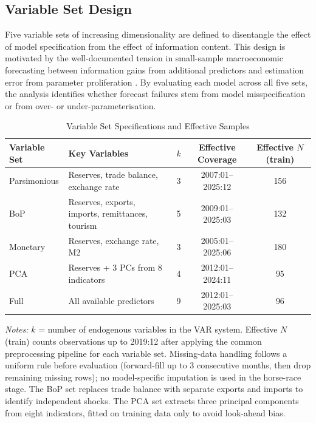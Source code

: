 \documentclass[12pt,a4paper]{article}
\begin{document}
\subsection{Variable Set Design}

Five variable sets of increasing dimensionality are defined to disentangle the effect of model specification from the effect of information content. This design is motivated by the well-documented tension in small-sample macroeconomic forecasting between information gains from additional predictors and estimation error from parameter proliferation \citep{Banbura2010,Carriero2015}. By evaluating each model across all five sets, the analysis identifies whether forecast failures stem from model misspecification or from over- or under-parameterisation.

\begin{table}[htbp]
\centering
\caption{Variable Set Specifications and Effective Samples}
\label{tab:varsets}
\begin{tabular}{llccc}
\toprule
Variable Set & Key Variables & $k$ & Effective Coverage & Effective $N$ (train) \\
\midrule
Parsimonious & Reserves, trade balance, exchange rate & 3 & 2007:01--2025:12 & 156 \\
BoP & Reserves, exports, imports, remittances, tourism & 5 & 2009:01--2025:03 & 132 \\
Monetary & Reserves, exchange rate, M2 & 3 & 2005:01--2025:06 & 180 \\
PCA & Reserves + 3 PCs from 8 indicators & 4 & 2012:01--2024:11 & 95 \\
Full & All available predictors & 9 & 2012:01--2025:03 & 96 \\
\bottomrule
\end{tabular}
\begin{tablenotes}
\small
\item \textit{Notes:} $k$ = number of endogenous variables in the VAR system. Effective $N$ (train) counts observations up to 2019:12 after applying the common preprocessing pipeline for each variable set. Missing-data handling follows a uniform rule before evaluation (forward-fill up to 3 consecutive months, then drop remaining missing rows); no model-specific imputation is used in the horse-race stage. The BoP set replaces trade balance with separate exports and imports to identify independent shocks. The PCA set extracts three principal components from eight indicators, fitted on training data only to avoid look-ahead bias.
\end{tablenotes}
\end{table}
\end{document}
